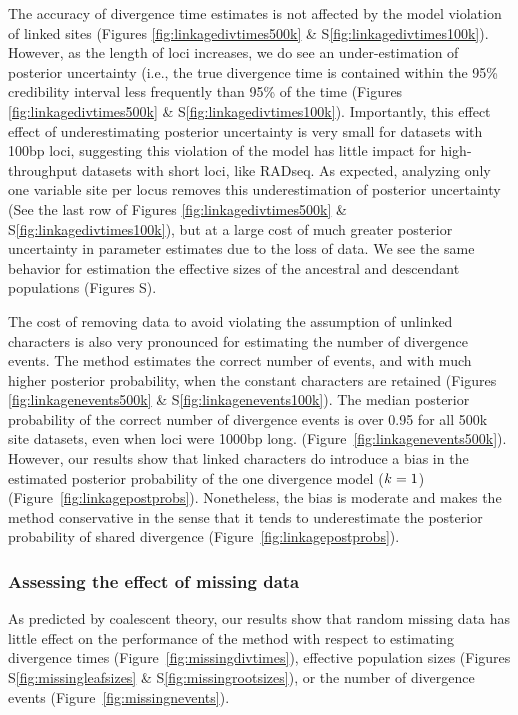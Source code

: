 The accuracy of divergence time estimates is not affected
by the model violation of linked sites
(Figures \ref{fig:linkagedivtimes500k}
\&
S\ref{fig:linkagedivtimes100k}).
However,
as the length of loci increases, we do see an under-estimation
of posterior uncertainty (i.e., the 
true divergence time is contained within the 95\% credibility interval 
less frequently than 95\% of the time
(Figures \ref{fig:linkagedivtimes500k}
\&
S\ref{fig:linkagedivtimes100k}).
Importantly, this effect effect of underestimating posterior uncertainty is
very small for datasets with 100bp loci, suggesting this violation of the model
has little impact for high-throughput datasets with short loci, like RADseq.
As expected, analyzing only one variable site per locus removes this underestimation
of posterior uncertainty
(See the last row of Figures \ref{fig:linkagedivtimes500k}
\&
S\ref{fig:linkagedivtimes100k}),
but at a large cost of much greater posterior uncertainty in parameter
estimates due to the loss of data.
We see the same behavior for estimation the effective sizes of the ancestral
and descendant populations
(Figures S).

The cost of removing data to avoid violating the assumption of unlinked
characters is also very pronounced for estimating the number of divergence
events.
The method estimates the correct number of events, and with much higher
posterior probability, when the constant characters are retained 
(Figures
\ref{fig:linkagenevents500k}
\&
S\ref{fig:linkagenevents100k}).
The median posterior probability of the correct number of divergence events is
over 0.95 for all 500k site datasets, even when loci were 1000bp long.
(Figure~\ref{fig:linkagenevents500k}).
However, our results show that linked characters do introduce a bias in the
estimated posterior probability of the one divergence model ($k_{} = 1$)
(Figure~\ref{fig:linkagepostprobs}).
Nonetheless, the bias is moderate and makes the method conservative in the
sense that it tends to underestimate the posterior probability of shared
divergence (Figure~\ref{fig:linkagepostprobs}).


\subsubsection{Assessing the effect of missing data}

As predicted by coalescent theory, our results show that random missing data
has little effect on the performance of the method with respect to estimating
divergence times
(Figure~\ref{fig:missingdivtimes}),
effective population sizes
(Figures
S\ref{fig:missingleafsizes}
\&
S\ref{fig:missingrootsizes}), or the number of divergence events
(Figure~\ref{fig:missingnevents}).


